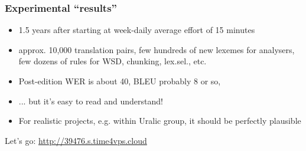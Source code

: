 \documentclass{beamer}
\begin{document}
\begin{frame}
    \frametitle{Experimental ``results''}
    \begin{itemize}
        \item 1.5 years after starting at week-daily average effort of 15
            minutes
        \item approx. 10,000 translation pairs, few hundreds of new lexemes for
            analysers, few dozens of rules for WSD, chunking, lex.sel., etc.
        \item Post-edition WER is about 40, BLEU probably 8 or so,
        \item ...  but it's easy to read and understand!
        \item For realistic projects, e.g. within Uralic group, it should be
            perfectly plausible
    \end{itemize}
    Let's go: \scriptsize{\url{http://39476.s.time4vps.cloud}}
\end{frame}
\end{document}

